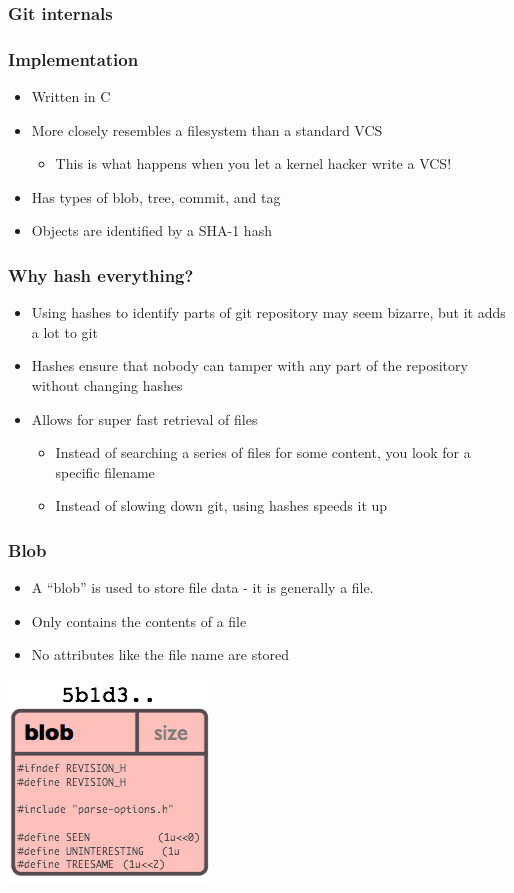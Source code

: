 \documentclass{beamer}
\begin{document}
\subsubsection{Git internals}

\begin{frame}
    \frametitle{Implementation}
    \begin{itemize}
	\item Written in C
	\item More closely resembles a filesystem than a standard VCS
	\begin{itemize}
	    \item This is what happens when you let a kernel hacker write a VCS!
	\end{itemize}
	\item Has types of blob, tree, commit, and tag
	\item Objects are identified by a SHA-1 hash
    \end{itemize}
\end{frame}

\begin{frame}
  \frametitle{Why hash everything?}
  \begin{itemize}
    \item Using hashes to identify parts of git repository may seem bizarre, but it adds a lot to git
    \item Hashes ensure that nobody can tamper with any part of the repository without changing hashes
    \item Allows for super fast retrieval of files
      \begin{itemize}
	\item Instead of searching a series of files for some content, you look for a specific filename
	\item Instead of slowing down git, using hashes speeds it up
      \end{itemize}
  \end{itemize}
\end{frame}

\begin{frame}
    \frametitle{Blob}
    \begin{itemize}
      \item A ``blob'' is used to store file data - it is generally a file.
      \item Only contains the contents of a file 
      \item No attributes like the file name are stored
    \end{itemize}
    \includegraphics{images/object-blob.png}
\end{frame}
\end{document}

